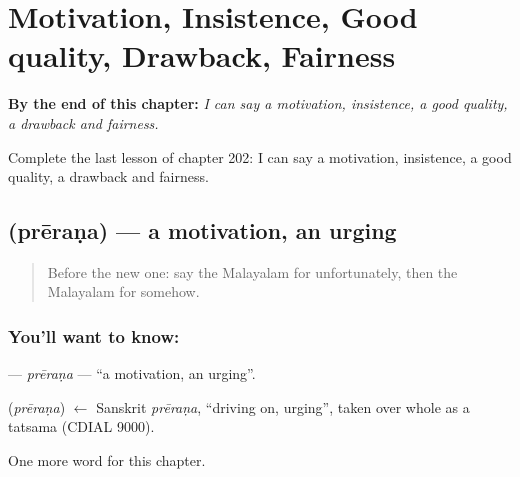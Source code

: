 
\chapter{Motivation, Insistence, Good quality, Drawback, Fairness}
\label{ch:ml-motivation-insistence-good-quality-drawback-fairness}

\begin{chapteropening}
\textbf{By the end of this chapter:} \emph{I can say a motivation, insistence, a good quality, a drawback and fairness.}

Complete the last lesson of chapter 202: I can say a motivation, insistence, a good quality, a drawback and fairness.
\end{chapteropening}

\section[\texorpdfstring{\ml{പ്രേരണ} (prēraṇa)}{പ്രേരണ (prēraṇa)}]{ (prēraṇa) — a motivation, an urging}

\label{lesson:ML-C202-prerana}



\begin{quote}
Before the new one: say the Malayalam for unfortunately, then the Malayalam for somehow.
\end{quote}

\subsection*{You'll want to know: }
\textbf{} — \emph{prēraṇa} — \textquotedblleft{}a motivation, an urging\textquotedblright{}.

\begin{cousinweb}
\textbf{} (\emph{prēraṇa}) $\leftarrow$ Sanskrit \emph{prēraṇa}, \textquotedblleft{}driving on, urging\textquotedblright{}, taken over whole as a tatsama (CDIAL 9000).
\end{cousinweb}

\begin{grammarlens}[title={What you've built}]
One more word for this chapter.
\end{grammarlens}

